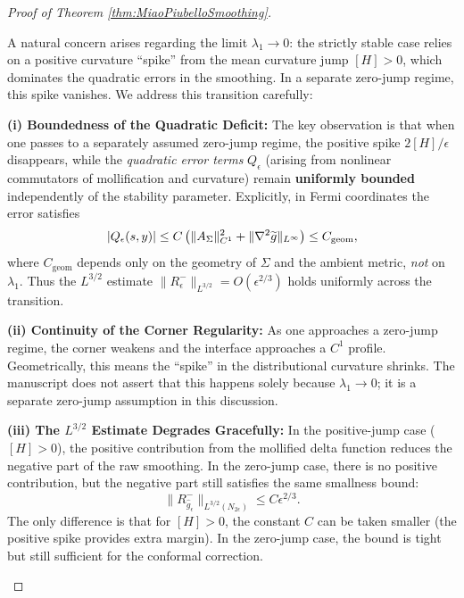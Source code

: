 \begin{proof}[Proof of Theorem \ref{thm:MiaoPiubelloSmoothing}]
\begin{remark}\label{rmk:MarginalTransition}
A natural concern arises regarding the limit $\lambda_1 \to 0$: the strictly stable case relies on a positive curvature ``spike'' from the mean curvature jump $[H] > 0$, which dominates the quadratic errors in the smoothing. In a separate zero-jump regime, this spike vanishes. We address this transition carefully:

\textbf{(i) Boundedness of the Quadratic Deficit:} The key observation is that when one passes to a separately assumed zero-jump regime, the positive spike $2[H]/\epsilon$ disappears, while the \emph{quadratic error terms} $Q_\epsilon$ (arising from nonlinear commutators of mollification and curvature) remain \textbf{uniformly bounded} independently of the stability parameter. Explicitly, in Fermi coordinates the error satisfies
\[
    |Q_\epsilon(s,y)| \le C \left( \|A_\Sigma\|_{C^1}^2 + \|\nabla^2 \widetilde{g}\|_{L^\infty} \right) \le C_{\text{geom}},
\]
where $C_{\text{geom}}$ depends only on the geometry of $\Sigma$ and the ambient metric, \emph{not} on $\lambda_1$. Thus the $L^{3/2}$ estimate $\|R^-_\epsilon\|_{L^{3/2}} = O(\epsilon^{2/3})$ holds uniformly across the transition.

\textbf{(ii) Continuity of the Corner Regularity:} As one approaches a zero-jump regime, the corner weakens and the interface approaches a $C^1$ profile. Geometrically, this means the ``spike'' in the distributional curvature shrinks. The manuscript does not assert that this happens solely because $\lambda_1 \to 0$; it is a separate zero-jump assumption in this discussion.

\textbf{(iii) The $L^{3/2}$ Estimate Degrades Gracefully:} In the positive-jump case ($[H] > 0$), the positive contribution from the mollified delta function reduces the negative part of the raw smoothing. In the zero-jump case, there is no positive contribution, but the negative part still satisfies the same smallness bound:
\[
    \|R^-_{\hat{g}_\epsilon}\|_{L^{3/2}(N_{2\epsilon})} \le C \epsilon^{2/3}.
\]
The only difference is that for $[H] > 0$, the constant $C$ can be taken smaller (the positive spike provides extra margin). In the zero-jump case, the bound is tight but still sufficient for the conformal correction.


\end{remark}
\end{proof}
